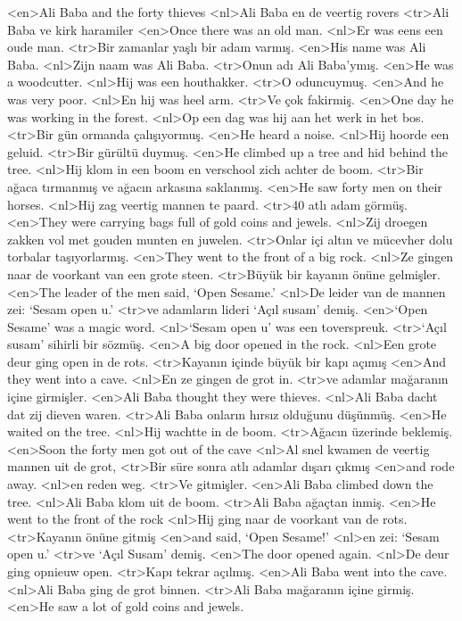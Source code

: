 <en>Ali Baba and the forty thieves 
<nl>Ali Baba en de veertig rovers 
<tr>Ali Baba ve kirk haramiler 
<en>Once there was an old man.
<nl>Er was eens een oude man. 
<tr>Bir zamanlar yaşlı bir adam varmış. 
<en>His name was Ali Baba.
<nl>Zijn naam was Ali Baba. 
<tr>Onun adı Ali Baba’ymış.
<en>He was a woodcutter.
<nl>Hij was een houthakker.
<tr>O oduncuymuş.
<en>And he was very poor.
<nl>En hij was heel arm.
<tr>Ve çok fakirmiş.
<en>One day he was working in the forest.
<nl>Op een dag was hij aan het werk in het bos. 
<tr>Bir gün ormanda çalışıyormuş.
<en>He heard a noise.
<nl>Hij hoorde een geluid. 
<tr>Bir gürültü duymuş.
<en>He climbed up a tree and hid behind the tree.
<nl>Hij klom in een boom en verschool zich achter de boom. 
<tr>Bir ağaca tırmanmış ve ağacın arkasına saklanmış.
<en>He saw forty men on their horses.
<nl>Hij zag veertig mannen te  paard.
<tr>40 atlı adam görmüş.
<en>They were carrying bags full of gold coins and jewels.
<nl>Zij droegen zakken vol met gouden munten en juwelen.
<tr>Onlar içi altın ve mücevher dolu torbalar taşıyorlarmış. 
<en>They went to the front of a big rock.
<nl>Ze gingen naar de voorkant van een grote steen. 
<tr>Büyük bir kayanın önüne gelmişler.
<en>The leader of the men said, `Open Sesame.'
<nl>De leider van de mannen zei: `Sesam open u.'
<tr>ve adamların lideri ‘Açıl susam’ demiş.
<en>`Open Sesame' was a magic word.
<nl>`Sesam open u' was een toverspreuk.
<tr>‘Açıl susam’ sihirli bir sözmüş.
<en>A big door opened in the rock.
<nl>Een grote deur ging open in de rots.
<tr>Kayanın içinde büyük bir kapı açımış
<en>And they went into a cave.
<nl>En ze gingen de grot in. 
<tr>ve adamlar mağaranın içine  girmişler.
<en>Ali Baba thought they were thieves.
<nl>Ali Baba dacht dat zij dieven waren.
<tr>Ali Baba onların hırsız olduğunu düşünmüş. 
<en>He waited  on the tree.
<nl>Hij wachtte in de boom. 
<tr>Ağacın üzerinde beklemiş.
<en>Soon the forty men got out of the cave
<nl>Al snel kwamen de veertig mannen uit de grot,
<tr>Bir süre sonra atlı adamlar dışarı çıkmış
<en>and rode away.
<nl>en reden weg. 
<tr>Ve gitmişler.
<en>Ali Baba climbed down the tree.
<nl>Ali Baba klom uit de boom.
<tr>Ali Baba ağaçtan inmiş.
<en>He went to the front of the rock
<nl>Hij ging naar de voorkant van de rots. 
<tr>Kayanın önüne gitmiş 
<en>and said, `Open Sesame!'
<nl>en zei: `Sesam open u.' 
<tr>ve `Açıl Susam’ demiş.
<en>The door opened again.
<nl>De deur ging opnieuw open.  
<tr>Kapı tekrar açılmış.
<en>Ali Baba went into the cave.
<nl>Ali Baba ging de grot binnen. 
<tr>Ali Baba mağaranın içine girmiş.
<en>He saw a lot of gold coins and jewels.
